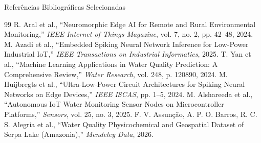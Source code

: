 \documentclass[aspectratio=169,10pt]{beamer}
\begin{document}
\begin{frame}{Referências Bibliográficas Selecionadas}
  \fontsize{6.8pt}{8.6pt}\selectfont
  \begin{thebibliography}{99}
     R. Aral et al., ``Neuromorphic Edge AI for Remote and Rural Environmental Monitoring,'' \textit{IEEE Internet of Things Magazine}, vol. 7, no. 2, pp. 42--48, 2024.
     M. Azadi et al., ``Embedded Spiking Neural Network Inference for Low-Power Industrial IoT,'' \textit{IEEE Transactions on Industrial Informatics}, 2025.
     T. Yan et al., ``Machine Learning Applications in Water Quality Prediction: A Comprehensive Review,'' \textit{Water Research}, vol. 248, p. 120890, 2024.
     M. Huijbregts et al., ``Ultra-Low-Power Circuit Architectures for Spiking Neural Networks on Edge Devices,'' \textit{IEEE ISCAS}, pp. 1--5, 2024.
     M. Alshareeda et al., ``Autonomous IoT Water Monitoring Sensor Nodes on Microcontroller Platforms,'' \textit{Sensors}, vol. 25, no. 3, 2025.
     F. V. Assunção, A. P. O. Barros, R. C. S. Alegria et al., ``Water Quality Physicochemical and Geospatial Dataset of Serpa Lake (Amazonia),'' \textit{Mendeley Data}, 2026.
  \end{thebibliography}
\end{frame}
\end{document}
